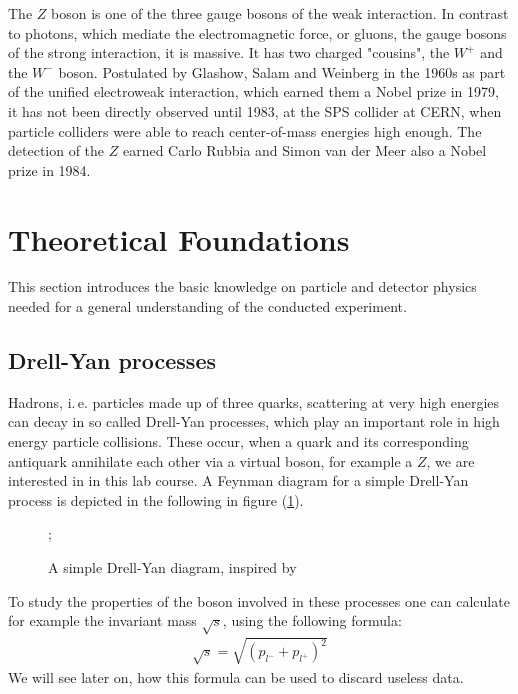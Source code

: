 \documentclass[twocolumn,
			   showpacs,%
               nofootinbib,
               aps,%
               prd,
               notitlepage,
               showkeys,
               10pt]{revtex4-1}
\begin{document}
The $Z$ boson is one of the three gauge bosons of the weak interaction. In contrast to photons, which mediate the electromagnetic force, or gluons, the gauge bosons of the strong interaction, it is massive. It has two charged "cousins", the $W^+$ and the $W^-$ boson. Postulated by Glashow, Salam and Weinberg in the 1960s as part of the unified electroweak interaction, which earned them a Nobel prize in 1979, it has not been directly observed until 1983, at the SPS collider at CERN, when particle colliders were able to reach center-of-mass energies high enough. The detection of the $Z$ earned Carlo Rubbia and Simon van der Meer also a Nobel prize in 1984.   


\section{Theoretical Foundations}
This section introduces the basic knowledge on particle and detector physics needed for a general understanding of the conducted experiment.

\subsection{Drell-Yan processes}
Hadrons, i.\,e. particles made up of three quarks, scattering at very high energies can decay in so called Drell-Yan processes, which play an important role in high energy particle collisions. These occur, when a quark and its corresponding antiquark annihilate each other via a virtual boson, for example a $Z$, we are interested in in this lab course. A Feynman diagram for a simple Drell-Yan process is depicted in the following in figure (\ref{fig:Drell-Yan}).

\begin{figure}[H]
\centering
{};
\caption{A simple Drell-Yan diagram, inspired by \cite{F91manual}}
\label{fig:Drell-Yan}
\end{figure}
	
To study the properties of the boson involved in these processes one can calculate for example the invariant mass $\sqrt{s}$, using the following formula:
\begin{align}
	\sqrt{s} = \sqrt{\left(p_{l^{-}} + p_{l^{+}}\right)^2}
\end{align}
We will see later on, how this formula can be used to discard useless data.
\end{document}
